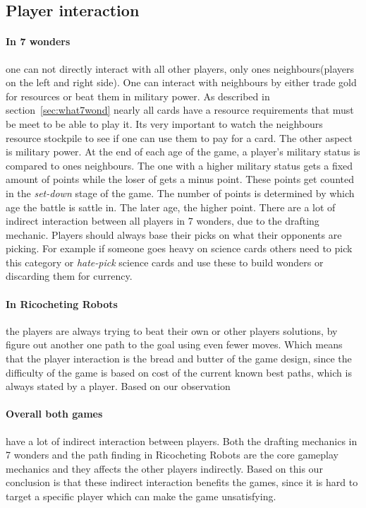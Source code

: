 \documentclass[a4paper]{article}
\begin{document}
\subsection{Player interaction}

\paragraph{In 7 wonders} one can not directly interact with all other players, only ones neighbours(players on the left and right side). One can interact with neighbours by either trade gold for resources or beat them in military power. As described in section~\ref{sec:what7wond} nearly all cards have a resource requirements that must be meet to be able to play it. Its very important to watch the neighbours resource stockpile to see if one can use them to pay for a card. The other aspect is military power. At the end of each age of the game, a player's military status is compared to ones neighbours. The one with a higher military status gets a fixed amount of points while the loser of gets a minus point. These points get counted in the \textit{set-down} stage of the game. The number of points is determined by which age the battle is sattle in. The later age, the higher point. 
There are a lot of indirect interaction between all players in 7 wonders, due to the drafting mechanic. Players should always base their picks on what their opponents are picking. For example if someone goes heavy on science cards others need to pick this category or \textit{hate-pick} science cards and use these to build wonders or discarding them for currency.

\paragraph{In Ricocheting Robots} the players are always trying to beat their own or other players solutions, by figure out another one path to the goal using even fewer moves. Which means that the player interaction is the bread and butter of the game design, since the difficulty of the game is based on cost of the current known best paths, which is always stated by a player. Based on our observation

\paragraph{Overall both games} have a lot of indirect interaction between players. Both the drafting mechanics in 7 wonders and the path finding in Ricocheting Robots are the core gameplay mechanics and they affects the other players indirectly. Based on this our conclusion is that these indirect interaction benefits the games, since it is hard to target a specific player which can make the game unsatisfying.
\end{document}
